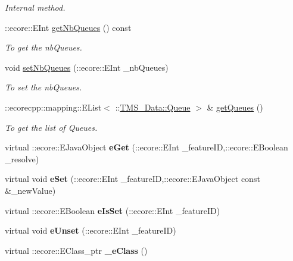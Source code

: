 \begin{DoxyCompactItemize}
\begin{DoxyCompactList}\small\item\em Internal method. \item\end{DoxyCompactList}\item 
::ecore::EInt \hyperlink{classTMS__Data_1_1ListQueues_a60a987dbdcf353ae6eff2e40b4235a97}{getNbQueues} () const 
\begin{DoxyCompactList}\small\item\em To get the nbQueues. \item\end{DoxyCompactList}\item 
void \hyperlink{classTMS__Data_1_1ListQueues_a51b68f4fc16a119c564434fd76777db7}{setNbQueues} (::ecore::EInt \_\-nbQueues)
\begin{DoxyCompactList}\small\item\em To set the nbQueues. \item\end{DoxyCompactList}\item 
::ecorecpp::mapping::EList$<$ ::\hyperlink{classTMS__Data_1_1Queue}{TMS\_\-Data::Queue} $>$ \& \hyperlink{classTMS__Data_1_1ListQueues_a5b9d7bce98a1aec105fcc2086a09fed0}{getQueues} ()
\begin{DoxyCompactList}\small\item\em To get the list of Queues. \item\end{DoxyCompactList}\item 
\hypertarget{classTMS__Data_1_1ListQueues_a279563a6dca42101f3ec8a03168b2ae7}{
virtual ::ecore::EJavaObject {\bfseries eGet} (::ecore::EInt \_\-featureID,::ecore::EBoolean \_\-resolve)}
\label{classTMS__Data_1_1ListQueues_a279563a6dca42101f3ec8a03168b2ae7}

\item 
\hypertarget{classTMS__Data_1_1ListQueues_a2e584b1697d6f741145a1e310974de2c}{
virtual void {\bfseries eSet} (::ecore::EInt \_\-featureID,::ecore::EJavaObject const \&\_\-newValue)}
\label{classTMS__Data_1_1ListQueues_a2e584b1697d6f741145a1e310974de2c}

\item 
\hypertarget{classTMS__Data_1_1ListQueues_a3470fdd8d2f237bb9c5a82c09246eca5}{
virtual ::ecore::EBoolean {\bfseries eIsSet} (::ecore::EInt \_\-featureID)}
\label{classTMS__Data_1_1ListQueues_a3470fdd8d2f237bb9c5a82c09246eca5}

\item 
\hypertarget{classTMS__Data_1_1ListQueues_a622dafc5b440bfe5a601254e68e46d8a}{
virtual void {\bfseries eUnset} (::ecore::EInt \_\-featureID)}
\label{classTMS__Data_1_1ListQueues_a622dafc5b440bfe5a601254e68e46d8a}

\item 
\hypertarget{classTMS__Data_1_1ListQueues_ab18dcd89fba29ceccae2b431446becbe}{
virtual ::ecore::EClass\_\-ptr {\bfseries \_\-eClass} ()}
\label{classTMS__Data_1_1ListQueues_ab18dcd89fba29ceccae2b431446becbe}

\end{DoxyCompactItemize}
